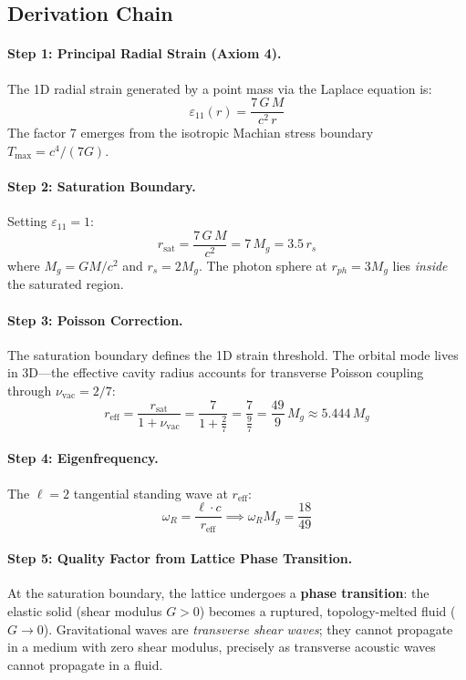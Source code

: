 \subsection{Derivation Chain}

\paragraph{Step 1: Principal Radial Strain (Axiom 4).}
The 1D radial strain generated by a point mass via the Laplace equation is:
\begin{equation}
    \varepsilon_{11}(r) = \frac{7\,G\,M}{c^2\,r}
\end{equation}
The factor 7 emerges from the isotropic Machian stress boundary $T_\mathrm{max} = c^4/(7G)$.

\paragraph{Step 2: Saturation Boundary.}
Setting $\varepsilon_{11} = 1$:
\begin{equation}
    r_\mathrm{sat} = \frac{7\,G\,M}{c^2} = 7\,M_g = 3.5\,r_s
\end{equation}
where $M_g = GM/c^2$ and $r_s = 2M_g$. The photon sphere at $r_{ph} = 3M_g$ lies \textit{inside} the saturated region.

\paragraph{Step 3: Poisson Correction.}
The saturation boundary defines the 1D strain threshold. The orbital mode lives in 3D---the effective cavity radius accounts for transverse Poisson coupling through $\nu_\mathrm{vac} = 2/7$:
\begin{equation}
    r_\mathrm{eff} = \frac{r_\mathrm{sat}}{1 + \nu_\mathrm{vac}} = \frac{7}{1 + \tfrac{2}{7}} = \frac{7}{\tfrac{9}{7}} = \frac{49}{9}\,M_g \approx 5.444\,M_g
\end{equation}

\paragraph{Step 4: Eigenfrequency.}
The $\ell = 2$ tangential standing wave at $r_\mathrm{eff}$:
\begin{equation}
    \omega_R = \frac{\ell \cdot c}{r_\mathrm{eff}} \implies \omega_R M_g = \frac{18}{49}
\end{equation}

\paragraph{Step 5: Quality Factor from Lattice Phase Transition.}
At the saturation boundary, the lattice undergoes a \textbf{phase transition}: the elastic solid (shear modulus $G > 0$) becomes a ruptured, topology-melted fluid ($G \to 0$). Gravitational waves are \textit{transverse shear waves}; they cannot propagate in a medium with zero shear modulus, precisely as transverse acoustic waves cannot propagate in a fluid.


